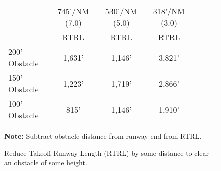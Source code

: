 \documentclass{article}
\begin{document}
\lsstyle

\raggedcolumns

\begin{figure}[ht]
    \centering

    \begin{tabular}{lcccccl}\toprule
        & \multicolumn{1}{c}{745'/NM (7.0\textdegree{})} & \multicolumn{1}{c}{530'/NM (5.0\textdegree{})} & \multicolumn{1}{c}{318'/NM (3.0\textdegree{})}
        \\\cmidrule(lr){2-2}\cmidrule(lr){3-3}\cmidrule(lr){4-4}
                    & RTRL   & RTRL   & RTRL\\\midrule
        200' Obstacle & 1,631' & 1,146' & 3,821'\\
        150' Obstacle & 1,223' & 1,719' & 2,866'\\
        100' Obstacle & 815'   & 1,146' & 1,910'\\
    \end{tabular}

    \hfill

    \textbf{Note:} Subtract obstacle distance from runway end from RTRL.

    \caption{Reduce Takeoff Runway Length (RTRL) by some distance to clear an obstacle of some height.}
\end{figure}
\end{document}
